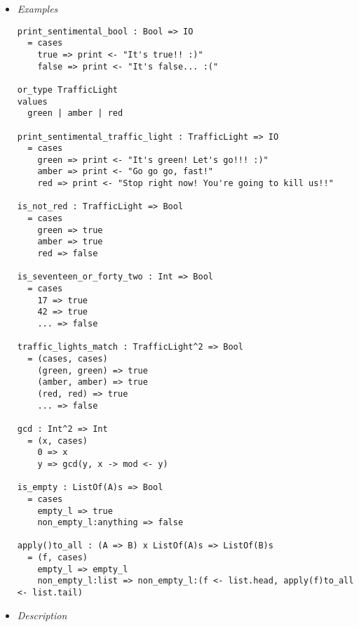 \documentclass{article}
\begin{document}
\begin{itemize}
\item \textit{Examples}

\begin{verbatim}
print_sentimental_bool : Bool => IO
  = cases
    true => print <- "It's true!! :)"
    false => print <- "It's false... :("

or_type TrafficLight
values
  green | amber | red

print_sentimental_traffic_light : TrafficLight => IO
  = cases
    green => print <- "It's green! Let's go!!! :)"
    amber => print <- "Go go go, fast!"
    red => print <- "Stop right now! You're going to kill us!!"

is_not_red : TrafficLight => Bool
  = cases
    green => true
    amber => true
    red => false

is_seventeen_or_forty_two : Int => Bool
  = cases
    17 => true
    42 => true
    ... => false

traffic_lights_match : TrafficLight^2 => Bool
  = (cases, cases)
    (green, green) => true
    (amber, amber) => true
    (red, red) => true
    ... => false

gcd : Int^2 => Int
  = (x, cases)
    0 => x
    y => gcd(y, x -> mod <- y) 

is_empty : ListOf(A)s => Bool
  = cases
    empty_l => true
    non_empty_l:anything => false

apply()to_all : (A => B) x ListOf(A)s => ListOf(B)s
  = (f, cases)
    empty_l => empty_l
    non_empty_l:list => non_empty_l:(f <- list.head, apply(f)to_all <- list.tail)

\end{verbatim}

\item \textit{Description}


\end{itemize}
\end{document}
